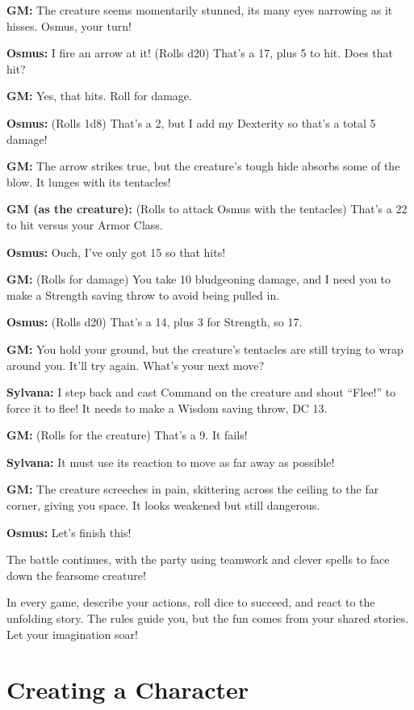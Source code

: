 \textbf{GM:} The creature seems momentarily stunned, its many eyes
narrowing as it hisses. Osmus, your turn!

\textbf{Osmus:} I fire an arrow at it! (Rolls d20) That's a 17, plus 5
to hit. Does that hit?

\textbf{GM:} Yes, that hits. Roll for damage.

\textbf{Osmus:} (Rolls 1d8) That's a 2, but I add my Dexterity so that's
a total 5 damage!

\textbf{GM:} The arrow strikes true, but the creature's tough hide
absorbs some of the blow. It lunges with its tentacles!

\textbf{GM (as the creature):} (Rolls to attack Osmus with the
tentacles) That's a 22 to hit versus your Armor Class.

\textbf{Osmus:} Ouch, I've only got 15 so that hits!

\textbf{GM:} (Rolls for damage) You take 10 bludgeoning damage, and I
need you to make a Strength saving throw to avoid being pulled in.

\textbf{Osmus:} (Rolls d20) That's a 14, plus 3 for Strength, so 17.

\textbf{GM:} You hold your ground, but the creature's tentacles are
still trying to wrap around you. It'll try again. What's your next move?

\textbf{Sylvana:} I step back and cast Command on the creature and shout
``Flee!'' to force it to flee! It needs to make a Wisdom saving throw,
DC 13.

\textbf{GM:} (Rolls for the creature) That's a 9. It fails!

\textbf{Sylvana:} It must use its reaction to move as far away as
possible!

\textbf{GM:} The creature screeches in pain, skittering across the
ceiling to the far corner, giving you space. It looks weakened but still
dangerous.

\textbf{Osmus:} Let's finish this!

The battle continues, with the party using teamwork and clever spells to
face down the fearsome creature!

In every game, describe your actions, roll dice to succeed, and react to
the unfolding story. The rules guide you, but the fun comes from your
shared stories. Let your imagination soar!

\section{Creating a Character}\label{creating-a-character}

